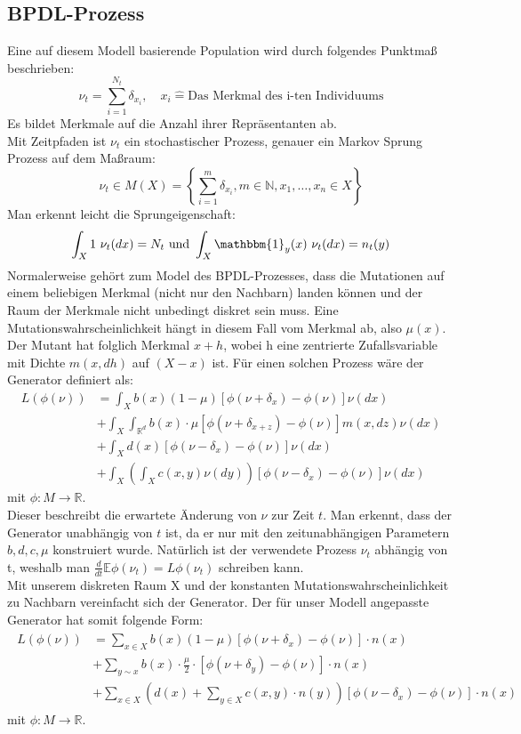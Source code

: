 \documentclass[11pt, a4paper, german]{article}
\theoremstyle{plain}
\begin{document}
	\subsection{BPDL-Prozess}
	Eine auf diesem Modell basierende Population wird durch folgendes Punktmaß beschrieben:
	\[ \nu_t = \sum_{i=1}^{N_t} \delta_{x_i}, \quad x_i \hat{=} \text{Das Merkmal des i-ten Individuums} \]
	Es bildet Merkmale auf die Anzahl ihrer Repräsentanten ab.\\
	Mit Zeitpfaden ist $ \nu_t $ ein stochastischer Prozess, genauer ein Markov Sprung Prozess auf dem Maßraum:
	\[ \nu_t \in M(X) = \left\{ \sum_{i=1}^{m} \delta_{x_i}, m \in \mathbb{N}, x_1, \dots, x_n \in X \right\} \]
	Man erkennt leicht die Sprungeigenschaft:
	\[ \int_X 1 \text{ } \nu_t(dx) = N_t 
	\text{ und }
	\int_X \mathbbm{1}_y(x) \text{ } \nu_t(dx) = n_t(y) \]
	Normalerweise gehört zum Model des BPDL-Prozesses, dass die Mutationen auf einem beliebigen Merkmal (nicht nur den Nachbarn) landen können und der Raum der Merkmale nicht unbedingt diskret sein muss. Eine Mutationswahrscheinlichkeit hängt in diesem Fall vom Merkmal ab, also $ \mu(x) $. Der Mutant hat folglich Merkmal $ x + h $, wobei h eine zentrierte Zufallsvariable mit Dichte $ m(x,dh) $ auf $ (X - x) $ ist.
	Für einen solchen Prozess wäre der Generator definiert als:
	\begin{align*}
		L(\phi(\nu)) &= \int_{X} b(x)(1-\mu)[\phi(\nu + \delta_x) - \phi(\nu)]\nu(dx)\\
					  &+ \int_{X}\int_{\mathbb{R}^d} b(x) \cdot \mu [\phi(\nu + \delta_{x+z}) - \phi(\nu)] m(x,dz) \nu(dx)\\
				  	  &+ \int_{X} d(x)[\phi(\nu - \delta_x) - \phi(\nu)]\nu(dx)\\
				 	  &+ \int_{X} \left( \int_{X} c(x,y) \nu(dy) \right) [\phi(\nu - \delta_x) - \phi(\nu)]\nu(dx)
	\end{align*}
	mit $ \phi: M \to \mathbb{R} $. \\
	Dieser beschreibt die erwartete Änderung von $ \nu $ zur Zeit $ t $. Man erkennt, dass der Generator unabhängig von $ t $ ist, da er nur mit den zeitunabhängigen Parametern $ b, d, c, \mu $ konstruiert wurde. Natürlich ist der verwendete Prozess $ \nu_t $ abhängig von t, weshalb man $ \frac{d}{dt}\mathbb{E}\phi(\nu_t) = L\phi(\nu_t) $ schreiben kann.\\
	Mit unserem diskreten Raum X und der konstanten Mutationswahrscheinlichkeit zu Nachbarn vereinfacht sich der Generator. Der für unser Modell angepasste Generator hat somit folgende Form:
	\begin{align}
	\begin{split}
		L(\phi(\nu)) &= \sum_{x \in X} b(x)(1-\mu)[\phi(\nu + \delta_{x}) - \phi(\nu)] \cdot n(x)\\
		&+ \sum_{y \sim x}b(x) \cdot \frac{\mu}{2} \cdot 
 [\phi(\nu + \delta_{y}) - \phi(\nu)] \cdot n(x)\\		 
		&+ \sum_{x \in X} \left(d(x) + \sum_{y \in X} c(x,y) \cdot n(y)\right)[\phi(\nu - \delta_{x}) - \phi(\nu)] \cdot n(x) \label{GeneratorDiskret}
	\end{split}
	\end{align}
	mit $ \phi: M \to \mathbb{R} $.\\
\end{document}
